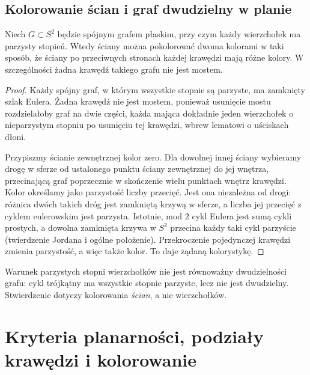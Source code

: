 \section{Kolorowanie ścian i graf dwudzielny w planie}
\label{sec:tg-planarne-color}

\begin{stwierdzenie}
Niech $G\subset S^2$ będzie spójnym grafem płaskim,
przy czym każdy wierzchołek ma parzysty stopień.
Wtedy ściany można pokolorować dwoma kolorami w taki sposób,
że ściany po przeciwnych stronach każdej krawędzi mają różne kolory.
W szczególności żadna krawędź takiego grafu nie jest mostem.
\end{stwierdzenie}

\begin{proof}
Każdy spójny graf, w którym wszystkie stopnie są parzyste,
ma zamknięty szlak Eulera. Żadna krawędź nie jest mostem,
ponieważ usunięcie mostu rozdzielałoby graf na dwie części,
każda mająca dokładnie jeden wierzchołek o nieparzystym stopniu
po usunięciu tej krawędzi, wbrew lematowi o uściskach dłoni.

Przypiszmy ścianie zewnętrznej kolor zero.
Dla dowolnej innej ściany wybieramy drogę w sferze
od ustalonego punktu ściany zewnętrznej do jej wnętrza,
przecinającą graf poprzecznie w skończenie wielu punktach
wnętrz krawędzi. Kolor określamy jako parzystość liczby
przecięć. Jest ona niezależna od drogi: różnica dwóch
takich dróg jest zamkniętą krzywą w sferze, a liczba
jej przecięć z cyklem eulerowskim jest parzysta.
Istotnie, mod $2$ cykl Eulera jest sumą cykli prostych,
a dowolna zamknięta krzywa w $S^2$ przecina każdy taki
cykl parzyście (twierdzenie Jordana i ogólne położenie).
Przekroczenie pojedynczej krawędzi zmienia parzystość,
a więc także kolor. To daje żądaną kolorystykę.
\end{proof}

\begin{uwaga}
Warunek parzystych stopni wierzchołków nie jest równoważny
dwudzielności grafu: cykl trójkątny ma wszystkie stopnie
parzyste, lecz nie jest dwudzielny. Stwierdzenie dotyczy
kolorowania \emph{ścian}, a nie wierzchołków.
\end{uwaga}


\chapter{Kryteria planarności, podziały krawędzi i kolorowanie}
\label{ch:tg-kuratowski}


